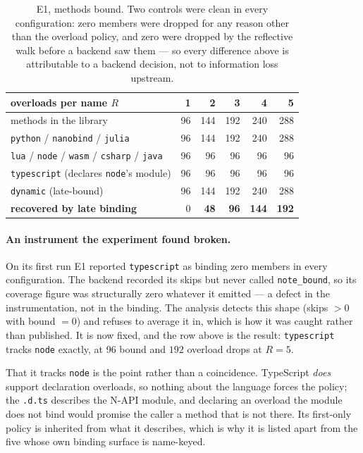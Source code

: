 \documentclass[11pt,a4paper]{article}
\newcommand{\code}[1]{\texttt{\small #1}}
\begin{document}
\begin{table}[h]
\centering\small
\begin{tabular}{lrrrrr}
\toprule
overloads per name $R$ & 1 & 2 & 3 & 4 & 5 \\
\midrule
methods in the library                          & 96 & 144 & 192 & 240 & 288 \\
\code{python} / \code{nanobind} / \code{julia}  & 96 & 144 & 192 & 240 & 288 \\
\code{lua} / \code{node} / \code{wasm} / \code{csharp} / \code{java} & 96 & 96 & 96 & 96 & 96 \\
\code{typescript} (declares \code{node}'s module) & 96 & 96 & 96 & 96 & 96 \\
\code{dynamic} (late-bound)                     & 96 & 144 & 192 & 240 & 288 \\
\midrule
\textbf{recovered by late binding}              & 0 & \textbf{48} & \textbf{96} & \textbf{144} & \textbf{192} \\
\bottomrule
\end{tabular}
\caption{E1, methods bound. Two controls were clean in every configuration:
zero members were dropped for any reason other than the overload policy, and
zero were dropped by the reflective walk before a backend saw them --- so every
difference above is attributable to a backend decision, not to information loss
upstream.}
\label{tab:e1}
\end{table}

\paragraph{An instrument the experiment found broken.} On its first run E1
reported \code{typescript} as binding zero members in every configuration. The
backend recorded its skips but never called \code{note\_bound}, so its coverage
figure was structurally zero whatever it emitted --- a defect in the
instrumentation, not in the binding. The analysis detects this shape
(skips $>0$ with bound $=0$) and refuses to average it in, which is how it was
caught rather than published. It is now fixed, and the row above is the result:
\code{typescript} tracks \code{node} exactly, at 96 bound and $192$ overload
drops at $R=5$.

That it tracks \code{node} is the point rather than a coincidence. TypeScript
\emph{does} support declaration overloads, so nothing about the language forces
the policy; the \code{.d.ts} describes the N-API module, and declaring an
overload the module does not bind would promise the caller a method that is not
there. Its first-only policy is inherited from what it describes, which is why
it is listed apart from the five whose own binding surface is name-keyed.
\end{document}
